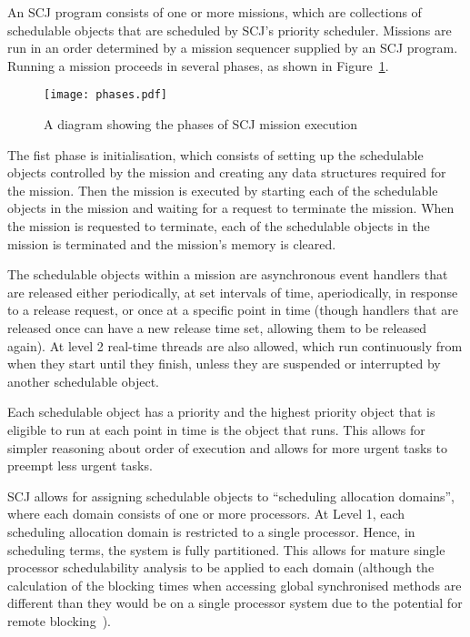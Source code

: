 \documentclass[a4paper,10pt]{report}
\begin{document}
An SCJ program consists of one or more missions, which are collections of
schedulable objects that are scheduled by SCJ's priority scheduler. Missions are
run in an order determined by a mission sequencer supplied by an SCJ program.
Running a mission proceeds in several phases, as shown in
Figure~\ref{phases-diagram}.

\begin{figure}[ht]
\texttt{[image: phases.pdf]}
\caption{A diagram showing the phases of SCJ mission execution}
\label{phases-diagram}
\end{figure}

The fist phase is initialisation, which consists of setting up the schedulable
objects controlled by the mission and creating any data structures required for
the mission.  Then the mission is executed by starting each of the schedulable
objects in the mission and waiting for a request to terminate the mission. When
the mission is requested to terminate, each of the schedulable objects in the
mission is terminated and the mission's memory is cleared.

The schedulable objects within a mission are asynchronous event handlers that
are released either periodically, at set intervals of time, aperiodically, in
response to a release request, or once at a specific point in time (though
handlers that are released once can have a new release time set, allowing them
to be released again).  At level 2 real-time threads are also allowed, which run
continuously from when they start until they finish, unless they are suspended
or interrupted by another schedulable object.

Each schedulable object has a priority and the highest priority object that is
eligible to run at each point in time is the object that runs. This allows for
simpler reasoning about order of execution and allows for more urgent tasks to
preempt less urgent tasks.

SCJ allows for assigning schedulable objects to ``scheduling allocation
domains'', where each domain consists of one or more processors.  At Level 1,
each scheduling allocation domain is restricted to a single processor.  Hence,
in scheduling terms, the system is fully partitioned. This allows for mature
single processor schedulability analysis to be applied to each domain (although
the calculation of the blocking times when accessing global synchronised methods
are different than they would be on a single processor system due to the
potential for remote blocking~\cite{davis2011}).
\end{document}
